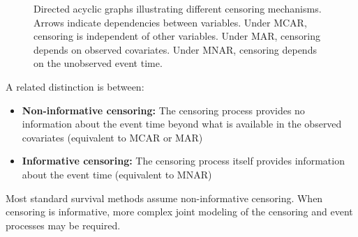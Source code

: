 \begin{figure}[htbp]
    \centering
    \caption{Directed acyclic graphs illustrating different censoring mechanisms. Arrows indicate dependencies between variables. Under MCAR, censoring is independent of other variables. Under MAR, censoring depends on observed covariates. Under MNAR, censoring depends on the unobserved event time.}
    \label{fig:censoring-mechanisms}
\end{figure}

\begin{notebox}[title=Non-informative vs. Informative Censoring]
A related distinction is between:
\begin{itemize}
    \item \textbf{Non-informative censoring:} The censoring process provides no information about the event time beyond what is available in the observed covariates (equivalent to MCAR or MAR)
    \item \textbf{Informative censoring:} The censoring process itself provides information about the event time (equivalent to MNAR)
\end{itemize}

Most standard survival methods assume non-informative censoring. When censoring is informative, more complex joint modeling of the censoring and event processes may be required.
\end{notebox}

